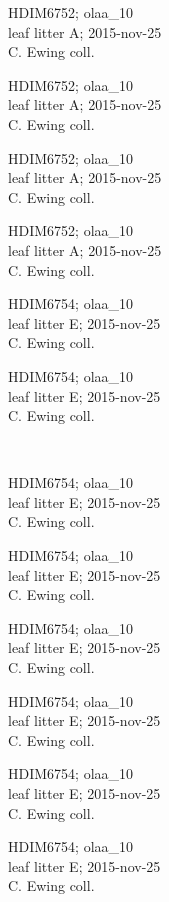\documentclass[2pt]{extarticle}
\begin{document}
\noindent
\parbox{0.16\textwidth}{\tiny \raggedright \rule[-0.3\baselineskip]{0pt}{10pt}HDIM6752; olaa\_10\\ leaf litter A; 2015-nov-25\\ C. Ewing coll.}
\parbox{0.16\textwidth}{\tiny \raggedright \rule[-0.3\baselineskip]{0pt}{10pt}HDIM6752; olaa\_10\\ leaf litter A; 2015-nov-25\\ C. Ewing coll.}
\parbox{0.16\textwidth}{\tiny \raggedright \rule[-0.3\baselineskip]{0pt}{10pt}HDIM6752; olaa\_10\\ leaf litter A; 2015-nov-25\\ C. Ewing coll.}
\parbox{0.16\textwidth}{\tiny \raggedright \rule[-0.3\baselineskip]{0pt}{10pt}HDIM6752; olaa\_10\\ leaf litter A; 2015-nov-25\\ C. Ewing coll.}
\parbox{0.16\textwidth}{\tiny \raggedright \rule[-0.3\baselineskip]{0pt}{10pt}HDIM6754; olaa\_10\\ leaf litter E; 2015-nov-25\\ C. Ewing coll.}
\parbox{0.16\textwidth}{\tiny \raggedright \rule[-0.3\baselineskip]{0pt}{10pt}HDIM6754; olaa\_10\\ leaf litter E; 2015-nov-25\\ C. Ewing coll.} \\ 
\vspace{0.001in} 

\noindent
\parbox{0.16\textwidth}{\tiny \raggedright \rule[-0.3\baselineskip]{0pt}{10pt}HDIM6754; olaa\_10\\ leaf litter E; 2015-nov-25\\ C. Ewing coll.}
\parbox{0.16\textwidth}{\tiny \raggedright \rule[-0.3\baselineskip]{0pt}{10pt}HDIM6754; olaa\_10\\ leaf litter E; 2015-nov-25\\ C. Ewing coll.}
\parbox{0.16\textwidth}{\tiny \raggedright \rule[-0.3\baselineskip]{0pt}{10pt}HDIM6754; olaa\_10\\ leaf litter E; 2015-nov-25\\ C. Ewing coll.}
\parbox{0.16\textwidth}{\tiny \raggedright \rule[-0.3\baselineskip]{0pt}{10pt}HDIM6754; olaa\_10\\ leaf litter E; 2015-nov-25\\ C. Ewing coll.}
\parbox{0.16\textwidth}{\tiny \raggedright \rule[-0.3\baselineskip]{0pt}{10pt}HDIM6754; olaa\_10\\ leaf litter E; 2015-nov-25\\ C. Ewing coll.}
\parbox{0.16\textwidth}{\tiny \raggedright \rule[-0.3\baselineskip]{0pt}{10pt}HDIM6754; olaa\_10\\ leaf litter E; 2015-nov-25\\ C. Ewing coll.} \\ 
\vspace{0.001in} 
\end{document}
